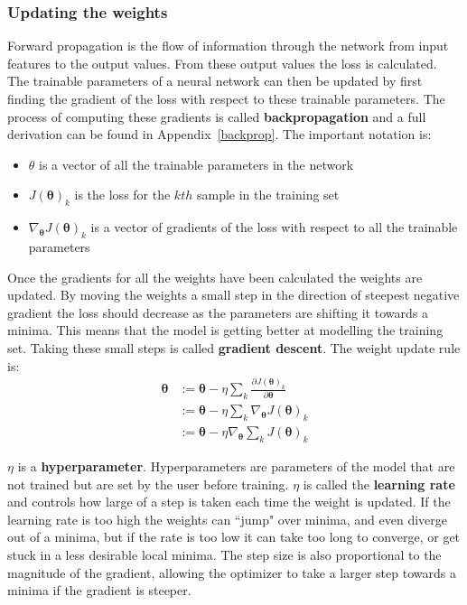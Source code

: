 \documentclass[12pt,a4paper,twoside,openright]{report}
\renewcommand{\vec}[1]{\bm{#1}}
\begin{document}
\subsubsection{Updating the weights}

Forward propagation is the flow of information through the network from input features to the output values. From these output values the loss is calculated. 
The trainable parameters of a neural network can then be updated by first finding the gradient of the loss with respect to these trainable parameters.
The process of computing these gradients is called \textbf{backpropagation} and a full derivation can be found in Appendix~\ref{backprop}. The important notation is:

\begin{itemize}
  \item $\theta$ is a vector of all the trainable parameters in the network
  \item $J(\vec{\theta})_k$ is the loss for the $kth$ sample in the training set
  \item $\nabla_{\vec{\theta}} J(\vec{\theta})_k$ is a vector of gradients of the loss with respect to all the trainable parameters 
\end{itemize}

Once the gradients for all the weights have been calculated the weights are updated. By moving the weights a small step in the direction of steepest 
negative gradient the loss should decrease as the parameters are shifting it towards a minima. This means that the model is getting 
better at modelling the training set. Taking these small steps is called \textbf{gradient descent}. The weight update rule is: 
\begin{align}
  \vec{\theta} & := \mathbf{\vec{\theta}} - \eta \sum_{k} \frac{\partial J(\vec{\theta})_k}{\partial \mathbf{\vec{\theta}}} \\
  & := \mathbf{\vec{\theta}} - \eta \sum_{k} \nabla_{\vec{\theta}} J(\vec{\theta})_k \\
  & := \mathbf{\vec{\theta}} - \eta \nabla_{\vec{\theta}} \sum_{k} J(\vec{\theta})_k \label{eq:weight}
\end{align}

$\eta$ is a \textbf{hyperparameter}. Hyperparameters are parameters of the model that are not trained but are set by the user before training.
$\eta$ is called the \textbf{learning rate} and controls how large of a step is taken each time the weight is updated. If the learning rate is 
too high the weights can ``jump" over minima, and even diverge out of a minima, but if the rate is too low it can take too long to converge,
or get stuck in a less desirable local minima. The step size is also proportional to the magnitude of the gradient, allowing the optimizer to 
take a larger step towards a minima if the gradient is steeper.
\end{document}
